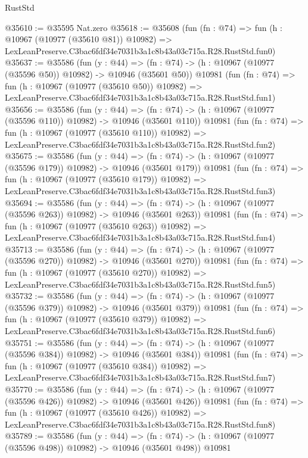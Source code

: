 \begin{lexlean}{RustStd}
\begin{coremodule}
@35610 := @35595 Nat.zero
@35618 := @35608
    (fun (fn : @74) =>
    fun (h : @10967 (@10977 (@35610 @81)) @10982) =>
    LexLeanPreserve.C3bac6fdf34e7031b3a1c8b43a03c715a.R28.RustStd.fun0)
@35637 := @35586
    (fun (y : @44) =>
    (fn : @74) -> (h : @10967 (@10977 (@35596 @50)) @10982) -> @10946 (@35601 @50))
    @10981
    (fun (fn : @74) =>
    fun (h : @10967 (@10977 (@35610 @50)) @10982) =>
    LexLeanPreserve.C3bac6fdf34e7031b3a1c8b43a03c715a.R28.RustStd.fun1)
@35656 := @35586
    (fun (y : @44) =>
    (fn : @74) -> (h : @10967 (@10977 (@35596 @110)) @10982) -> @10946 (@35601 @110))
    @10981
    (fun (fn : @74) =>
    fun (h : @10967 (@10977 (@35610 @110)) @10982) =>
    LexLeanPreserve.C3bac6fdf34e7031b3a1c8b43a03c715a.R28.RustStd.fun2)
@35675 := @35586
    (fun (y : @44) =>
    (fn : @74) -> (h : @10967 (@10977 (@35596 @179)) @10982) -> @10946 (@35601 @179))
    @10981
    (fun (fn : @74) =>
    fun (h : @10967 (@10977 (@35610 @179)) @10982) =>
    LexLeanPreserve.C3bac6fdf34e7031b3a1c8b43a03c715a.R28.RustStd.fun3)
@35694 := @35586
    (fun (y : @44) =>
    (fn : @74) -> (h : @10967 (@10977 (@35596 @263)) @10982) -> @10946 (@35601 @263))
    @10981
    (fun (fn : @74) =>
    fun (h : @10967 (@10977 (@35610 @263)) @10982) =>
    LexLeanPreserve.C3bac6fdf34e7031b3a1c8b43a03c715a.R28.RustStd.fun4)
@35713 := @35586
    (fun (y : @44) =>
    (fn : @74) -> (h : @10967 (@10977 (@35596 @270)) @10982) -> @10946 (@35601 @270))
    @10981
    (fun (fn : @74) =>
    fun (h : @10967 (@10977 (@35610 @270)) @10982) =>
    LexLeanPreserve.C3bac6fdf34e7031b3a1c8b43a03c715a.R28.RustStd.fun5)
@35732 := @35586
    (fun (y : @44) =>
    (fn : @74) -> (h : @10967 (@10977 (@35596 @379)) @10982) -> @10946 (@35601 @379))
    @10981
    (fun (fn : @74) =>
    fun (h : @10967 (@10977 (@35610 @379)) @10982) =>
    LexLeanPreserve.C3bac6fdf34e7031b3a1c8b43a03c715a.R28.RustStd.fun6)
@35751 := @35586
    (fun (y : @44) =>
    (fn : @74) -> (h : @10967 (@10977 (@35596 @384)) @10982) -> @10946 (@35601 @384))
    @10981
    (fun (fn : @74) =>
    fun (h : @10967 (@10977 (@35610 @384)) @10982) =>
    LexLeanPreserve.C3bac6fdf34e7031b3a1c8b43a03c715a.R28.RustStd.fun7)
@35770 := @35586
    (fun (y : @44) =>
    (fn : @74) -> (h : @10967 (@10977 (@35596 @426)) @10982) -> @10946 (@35601 @426))
    @10981
    (fun (fn : @74) =>
    fun (h : @10967 (@10977 (@35610 @426)) @10982) =>
    LexLeanPreserve.C3bac6fdf34e7031b3a1c8b43a03c715a.R28.RustStd.fun8)
@35789 := @35586
    (fun (y : @44) =>
    (fn : @74) -> (h : @10967 (@10977 (@35596 @498)) @10982) -> @10946 (@35601 @498))
    @10981

\end{coremodule}
\end{lexlean}
